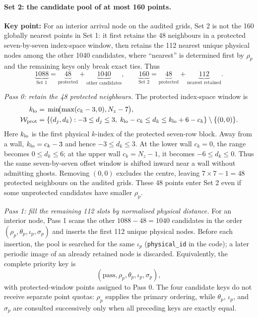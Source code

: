 \documentclass[11pt,a4paper]{article}
\begin{document}
\paragraph{Set 2: the candidate pool of at most 160 points.}
\noindent\textbf{Key point:} For an interior arrival node on the audited grids, Set 2 is
not the 160 globally nearest points in Set 1: it first retains the 48 neighbours in a
protected seven-by-seven index-space window, then retains the 112 nearest unique
physical nodes among the other 1040 candidates, where ``nearest'' is determined first
by $\rho_p$ and the remaining keys only break exact ties. Thus
\begin{equation}
 \underbrace{1088}_{\text{Set 1}}
 =\underbrace{48}_{\text{protected}}+\underbrace{1040}_{\text{other candidates}},
 \qquad
 \underbrace{160}_{\text{Set 2}}
 =\underbrace{48}_{\text{protected}}+\underbrace{112}_{\text{nearest retained}}.
\label{eq:set-two-counts}
\end{equation}

\emph{Pass 0: retain the 48 protected neighbours.}
The protected index-space window is
\begin{equation}
\begin{aligned}
 k_{\rm lo}={}&\min\!\bigl(\max(c_k-3,0),N_z-7\bigr),\\
 \mathcal W_{\rm prot}={}&\{(d_j,d_k):-3\le d_j\le3,\;
 k_{\rm lo}-c_k\le d_k\le k_{\rm lo}+6-c_k\}
 \setminus\{(0,0)\}.
\end{aligned}
\label{eq:mandatory-window}
\end{equation}
Here $k_{\rm lo}$ is the first physical $k$-index of the protected seven-row block.
Away from a wall, $k_{\rm lo}=c_k-3$ and hence $-3\le d_k\le3$. At the lower wall
$c_k=0$, the range becomes $0\le d_k\le6$; at the upper wall $c_k=N_z-1$, it becomes
$-6\le d_k\le0$. Thus the same seven-by-seven offset window is shifted inward near a
wall without admitting ghosts. Removing $(0,0)$ excludes the centre, leaving
$7\mathbin{\times}7-1=48$ protected neighbours on the audited grids. These 48 points
enter Set 2 even if some unprotected candidates have smaller $\rho_p$.

\emph{Pass 1: fill the remaining 112 slots by normalised physical distance.}
For an interior node, Pass 1 scans the other $1088-48=1040$ candidates in the order
$ (\rho_p,\theta_p,\iota_p,\sigma_p)$ and inserts the first 112 unique physical nodes.
Before each insertion, the pool is searched for the same $\iota_p$
(\texttt{physical\_id} in the code); a later periodic image of an already retained node
is discarded. Equivalently, the complete priority key is
\[
 (\mathrm{pass},\rho_p,\theta_p,\iota_p,\sigma_p),
\]
with protected-window points assigned to Pass 0. The four candidate keys do not receive
separate point quotas: $\rho_p$ supplies the primary ordering, while $\theta_p$,
$\iota_p$, and $\sigma_p$ are consulted successively only when all preceding keys are
exactly equal.
\end{document}
